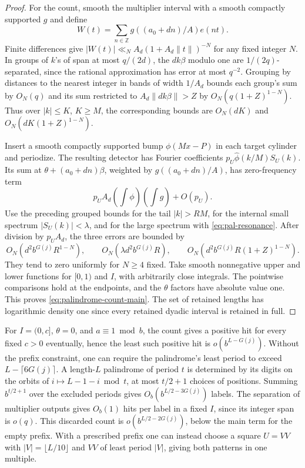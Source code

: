 \begin{proof}
For the count, smooth the multiplier interval with a smooth compactly supported \(g\) and define
\[
 W(t)=\sum_{n\in\mathbb Z}g((a_0+dn)/A)e(nt).
\]
Finite differences give \(|W(t)|\ll_N A_d(1+A_d\|t\|)^{-N}\) for any fixed integer \(N\). In groups of \(k\)'s of span at most \(q/(2d)\), the \(dk\beta\) modulo one are \(1/(2q)\)-separated, since the rational approximation has error at most \(q^{-2}\). Grouping by distances to the nearest integer in bands of width \(1/A_d\) bounds each group's sum by \(O_N(q)\) and its sum restricted to \(A_d\|dk\beta\|>Z\) by \(O_N(q(1+Z)^{1-N})\). Thus over \(|k|\le K\), \(K\ge M\), the corresponding bounds are \(O_N(dK)\) and \(O_N(dK(1+Z)^{1-N})\).

Insert a smooth compactly supported bump \(\phi(Mx-P)\) in each target cylinder and periodize. The resulting detector has Fourier coefficients \(p_U\widehat\phi(k/M)S_U(k)\). Its sum at \(\theta+(a_0+dn)\beta\), weighted by \(g((a_0+dn)/A)\), has zero-frequency term
\[
                 p_U A_d\left(\int\phi\right)\left(\int g\right)+O(p_U).
\]
Use the preceding grouped bounds for the tail \(|k|>RM\), for the internal small spectrum \(|S_U(k)|<\lambda\), and for the large spectrum with \eqref{eq:pal-resonance}. After division by \(p_U A_d\), the three errors are bounded by
\[
   O_N(d^2b^{G(j)}R^{1-N}),\qquad
   O_N(\lambda d^2b^{G(j)}R),\qquad
   O_N(d^2b^{G(j)}R(1+Z)^{1-N}).
\]
They tend to zero uniformly for \(N\ge4\) fixed. Take smooth nonnegative upper and lower functions for \([0,1)\) and \(I\), with arbitrarily close integrals. The pointwise comparisons hold at the endpoints, and the \(\theta\) factors have absolute value one. This proves \eqref{eq:palindrome-count-main}. The set of retained lengths has logarithmic density one since every retained dyadic interval is retained in full.
\end{proof}

For \(I=(0,c]\), \(\theta=0\), and \(a\equiv1\bmod b\), the count gives a positive hit for every fixed \(c>0\) eventually, hence the least such positive hit is \(o(b^{L-G(j)})\). Without the prefix constraint, one can require the palindrome's least period to exceed \(L-\lceil6G(j)\rceil\). A length-\(L\) palindrome of period \(t\) is determined by its digits on the orbits of \(i\mapsto L-1-i\bmod t\), at most \(t/2+1\) choices of positions. Summing \(b^{t/2+1}\) over the excluded periods gives \(O_b(b^{L/2-3G(j)})\) labels. The separation of multiplier outputs gives \(O_b(1)\) hits per label in a fixed \(I\), since its integer span is \(o(q)\). This discarded count is \(o(b^{L/2-2G(j)})\), below the main term for the empty prefix. With a prescribed prefix one can instead choose a square \(U=VV\) with \(|V|=\lfloor L/10\rfloor\) and \(VV\) of least period \(|V|\), giving both patterns in one multiple.

